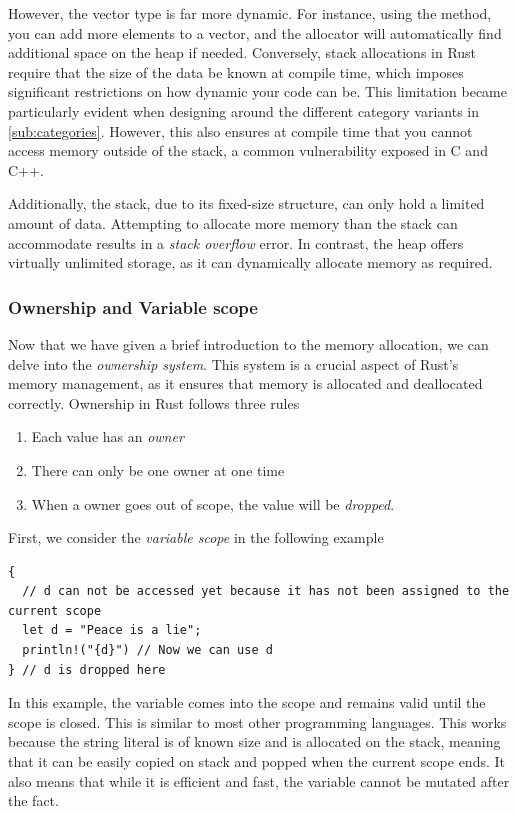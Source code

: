 \documentclass[11pt]{report}
\theoremstyle{definition}
\theoremstyle{plain}
\begin{document}
However, the vector type is far more dynamic. For instance, using the  method, you can add more elements to a vector, and the allocator will automatically find additional space on the heap if needed. Conversely, stack allocations in Rust require that the size of the data be known at compile time, which imposes significant restrictions on how dynamic your code can be. This limitation became particularly evident when designing around the different category variants in \autoref{sub:categories}. However, this also ensures at compile time that you cannot access memory outside of the stack, a common vulnerability exposed in C and C++.

Additionally, the stack, due to its fixed-size structure, can only hold a limited amount of data. Attempting to allocate more memory than the stack can accommodate results in a \textit{stack overflow} error. In contrast, the heap offers virtually unlimited storage, as it can dynamically allocate memory as required.

\subsubsection{Ownership and Variable scope}
Now that we have given a brief introduction to the memory allocation, we can delve into the \textit{ownership system}. This system is a crucial aspect of Rust's memory management, as it ensures that memory is allocated and deallocated correctly. Ownership in Rust follows three rules
\begin{enumerate}[parsep=0pt, itemsep=0pt]
  \item Each value has an \textit{owner}
  \item There can only be one owner at one time
  \item When a owner goes out of scope, the value will be \textit{dropped}.
\end{enumerate}
First, we consider the \textit{variable scope} in the following example
\begin{verbatim}
{
  // d can not be accessed yet because it has not been assigned to the current scope
  let d = "Peace is a lie";
  println!("{d}") // Now we can use d
} // d is dropped here
\end{verbatim}
In this example, the variable  comes into the scope and remains valid until the scope is closed. This is similar to most other programming languages. This works because the string literal  is of known size and is allocated on the stack, meaning that it can be easily copied on stack and popped when the current scope ends. It also means that while it is efficient and fast, the variable  cannot be mutated after the fact.
\end{document}
